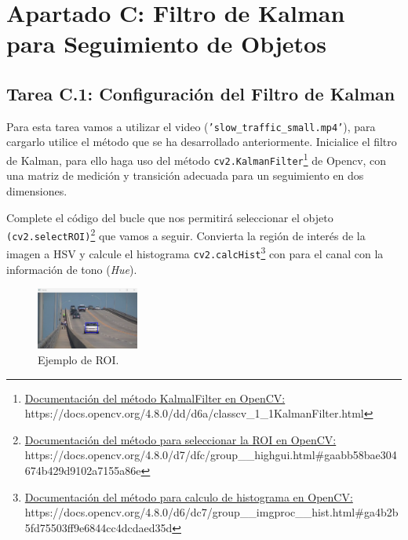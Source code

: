 \chapter{Apartado C: \textbf{Filtro de Kalman para Seguimiento de Objetos}}
\label{chapter:tarea_c}

\section*{Tarea C.1: Configuración del Filtro de Kalman}
{}
Para esta tarea vamos a utilizar el video (\texttt{'slow\_traffic\_small.mp4'}), para cargarlo utilice el método que se ha desarrollado anteriormente. Inicialice el filtro de Kalman, para ello haga uso del método \texttt{cv2.KalmanFilter}\footnote{ \href{https://docs.opencv.org/4.8.0/dd/d6a/classcv_1_1KalmanFilter.html}{Documentación del método KalmalFilter en OpenCV:} \\{https://docs.opencv.org/4.8.0/dd/d6a/classcv\_1\_1KalmanFilter.html}} de Opencv, con una matriz de medición y transición adecuada para un seguimiento en dos dimensiones.

Complete el código del bucle que nos permitirá seleccionar el objeto \texttt{(cv2.selectROI)}\footnote{ \href{https://docs.opencv.org/4.8.0/d7/dfc/group\_\_highgui.html\#gaabb58bae304674b429d9102a7155a86e}{Documentación del método para seleccionar la ROI en OpenCV:} \\{https://docs.opencv.org/4.8.0/d7/dfc/group\_\_highgui.html\#gaabb58bae304674b429d9102a7155a86e}} que vamos a seguir. Convierta la región de interés de la imagen a HSV y calcule el histograma \texttt{cv2.calcHist}\footnote{ \href{https://docs.opencv.org/4.8.0/d6/dc7/group\_\_imgproc\_\_hist.html\#ga4b2b5fd75503ff9e6844cc4dcdaed35d}{Documentación del método para calculo de histograma en OpenCV:} \\{https://docs.opencv.org/4.8.0/d6/dc7/group\_\_imgproc\_\_hist.html\#ga4b2b5fd75503ff9e6844cc4dcdaed35d}} con  para el canal con la información de tono (\textit{Hue}).

\begin{figure}[H]
    \centering
    \includegraphics[width=0.3\textwidth]{Lab_4/template/figures/roi_selection.png}
    \caption{Ejemplo de ROI.}
    \label{fig:ejemplo_ROI_kalman}
\end{figure}

